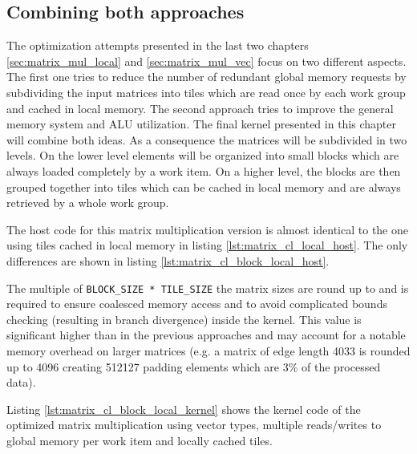 \subsection{Combining both approaches}
The optimization attempts presented in the last two chapters \ref{sec:matrix_mul_local} and \ref{sec:matrix_mul_vec} focus on two different aspects. The first one tries to reduce the number of redundant global memory requests by subdividing the input matrices into tiles which are read once by each work group and cached in local memory. The second approach tries to improve the general memory system and ALU utilization. The final kernel presented in this chapter will combine both ideas.
As a consequence the matrices will be subdivided in two levels. On the lower level elements will be organized into small blocks which are always loaded completely by a work item. On a higher level, the blocks are then grouped together into tiles which can be cached in local memory and are always retrieved by a whole work group.

The host code for this matrix multiplication version is almost identical to the one using tiles cached in local memory in listing \ref{lst:matrix_cl_local_host}. The only differences are shown in listing \ref{lst:matrix_cl_block_local_host}.



The multiple of \lstinline!BLOCK_SIZE * TILE_SIZE! the matrix sizes are round up to and is required to ensure coalesced memory access and to avoid complicated bounds checking (resulting in branch divergence) inside the kernel. This value is significant higher than in the previous approaches and may account for a notable memory overhead on larger matrices (e.g. a matrix of edge length 4033 is rounded up to 4096 creating 512127 padding elements which are 3\% of the processed data).

Listing \ref{lst:matrix_cl_block_local_kernel} shows the kernel code of the optimized matrix multiplication using vector types, multiple reads/writes to global memory per work item and locally cached tiles.



